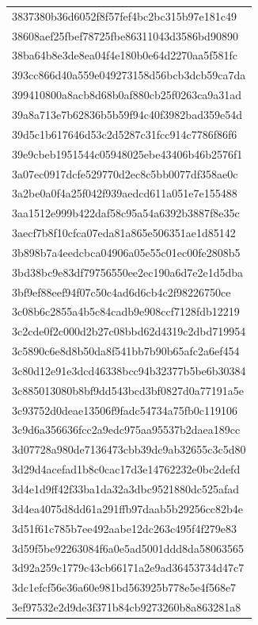 \begin{tabular}{l}
3837380b36d6052f8f57fef4bc2bc315b97e181c49 \\
38608aef25fbef78725fbe86311043d3586bd90890 \\
38ba64b8e3de8ea04f4e180b0e64d2270aa5f581fc \\
393cc866d40a559e049273158d56bcb3dcb59ca7da \\
399410800a8acb8d68b0af880cb25f0263ca9a31ad \\
39a8a713e7b62836b5b59f94c40f3982bad359e54d \\
39d5c1b617646d53c2d5287c31fcc914c7786f86f6 \\
39e9cbeb1951544c05948025ebe43406b46b2576f1 \\
3a07ec0917dcfe529770d2ec8c5bb0077df358ae0c \\
3a2be0a0f4a25f042f939aedcd611a051e7e155488 \\
3aa1512e999b422daf58c95a54a6392b3887f8e35c \\
3aecf7b8f10cfca07eda81a865e506351ae1d85142 \\
3b898b7a4eedcbca04906a05e55c01ec00fe2808b5 \\
3bd38bc9e83df79756550ee2ec190a6d7e2e1d5dba \\
3bf9ef88eef94f07c50c4ad6d6cb4c2f98226750ce \\
3c08b6c2855a4b5c84cadb9e908ccf7128fdb12219 \\
3c2cde0f2c000d2b27c08bbd62d4319c2dbd719954 \\
3c5890c6e8d8b50da8f541bb7b90b65afc2a6ef454 \\
3c80d12e91e3dcd46338bcc94b32377b5be6b30384 \\
3c885013080b8bf9dd543bcd3bf0827d0a77191a5e \\
3c93752d0deae13506f9fadc54734a75fb0c119106 \\
3c9d6a356636fcc2a9edc975aa95537b2daea189cc \\
3d07728a980de7136473cbb39dc9ab32655c3c5d80 \\
3d29d4acefad1b8c0cac17d3e14762232e0bc2defd \\
3d4e1d9ff42f33ba1da32a3dbc9521880dc525afad \\
3d4ea4075d8dd61a291ffb97daab5b29256cc82b4e \\
3d51f61c785b7ee492aabe12dc263c495f4f279e83 \\
3d59f5be92263084f6a0e5ad5001ddd8da58063565 \\
3d92a259c1779c43cb66171a2e9ad36453734d47c7 \\
3dc1efcf56e36a60e981bd563925b778e5e4f568e7 \\
3ef97532e2d9de3f371b84cb9273260b8a863281a8 \\

\end{tabular}
